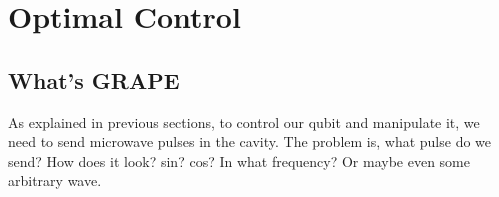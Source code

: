 \documentclass[english, a4paper, 12pt, twoside]{article}
\numberwithin{equation}{section} %
\begin{document}

\newpage
\section{Optimal Control}\label{chap:optimal}

\subsection{What's GRAPE}
As explained in previous sections, to control our qubit and manipulate it, we need to send microwave pulses in the cavity. The problem is, what pulse do we send? How does it look? sin? cos? In what frequency? Or maybe even some arbitrary wave.
\end{document}
